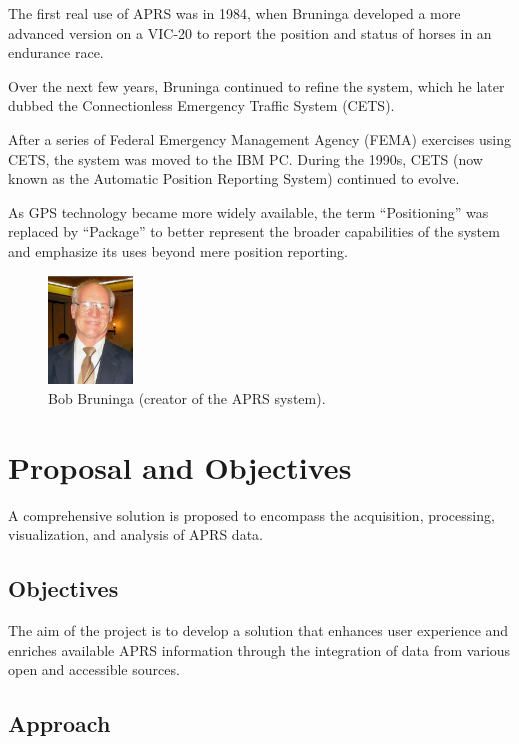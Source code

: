 The first real use of APRS was in 1984, when Bruninga developed a more advanced version on a VIC-20 to report the position and status of horses in an endurance race.

Over the next few years, Bruninga continued to refine the system, which he later dubbed the Connectionless Emergency Traffic System (CETS).

After a series of Federal Emergency Management Agency (FEMA) exercises using CETS, the system was moved to the IBM PC. During the 1990s, CETS (now known as the Automatic Position Reporting System) continued to evolve.

As GPS technology became more widely available, the term ``Positioning'' was replaced by ``Package'' to better represent the broader capabilities of the system and emphasize its uses beyond mere position reporting.

\begin{figure}[h]
	\centering
	\includegraphics[width=0.2\textwidth]{Imagenes/Chapter_1/bob_bruninga.png}
	\caption{Bob Bruninga (creator of the APRS system).}
	\label{fig:bob-bruninga-en}
\end{figure}


\section{Proposal and Objectives}

A comprehensive solution is proposed to encompass the acquisition, processing, visualization, and analysis of APRS data.

\subsection{Objectives}

The aim of the project is to develop a solution that enhances user experience and enriches available APRS information through the integration of data from various open and accessible sources.

\subsection{Approach}

